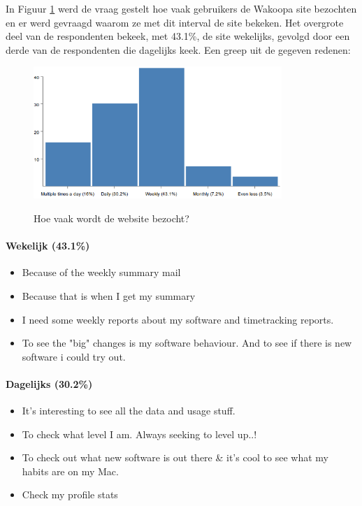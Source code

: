       In Figuur \ref{fig:visit-website} werd de vraag gestelt hoe vaak gebruikers de Wakoopa site bezochten en er werd gevraagd waarom ze met dit interval de site bekeken. Het overgrote deel van de respondenten bekeek, met 43.1\%, de site wekelijks, gevolgd door een derde van de respondenten die dagelijks keek. Een greep uit de gegeven redenen:
        \begin{figure}
          \begin{center}
          \caption{Hoe vaak wordt de website bezocht?}
            \includegraphics[height=50mm]{../images/enquete/visit-website}
          \label{fig:visit-website}
          \end{center}
        \end{figure}

      \paragraph{Wekelijk (43.1\%)}
        \begin{itemize}
          \item Because of the weekly summary mail
          \item Because that is when I get my summary
          \item I need some weekly reports about my software and timetracking reports.
          \item To see the "big" changes is my software behaviour. And to see if there is new software i could try out.
        \end{itemize}

      \paragraph{Dagelijks (30.2\%)}
        \begin{itemize}
          \item It's interesting to see all the data and usage stuff.
          \item To check what level I am. Always seeking to level up..!
          \item To check out what new software is out there \& it's cool to see what my habits are on my Mac.
          \item Check my profile stats
        \end{itemize}

